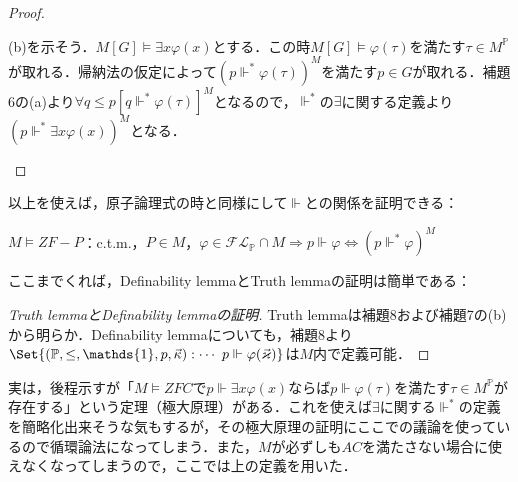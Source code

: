 \documentclass[a4j]{bxjsarticle}
\theoremstyle{definition}
\begin{document}
\begin{proof}
\begin{description}[style=nextline,font=\underline]
 (b)を示そう．$M[G] \models \exists x \varphi(x)$とする．この時$M[G] \models \varphi(\tau)$を満たす$\tau \in M^\mathbb{P}$が取れる．帰納法の仮定によって$(p \mathrel{\Vdash^*} \varphi(\tau))^M$を満たす$p \in G$が取れる．補題6の(a)より$\forall q \leq p [q \mathrel{\Vdash^*} \varphi(\tau)]^M$となるので，$\mathrel{\Vdash^*}$の$\exists$に関する定義より$(p \mathrel{\Vdash^*} \exists x \varphi(x))^M$となる．
\end{description}\mbox{}
\end{proof}

以上を使えば，原子論理式の時と同様にして$\Vdash$との関係を証明できる：

\begin{lemma}\label{forces:relativization}
 $M \models ZF-P$：c.t.m.，$P \in M$，$\varphi \in \mathcal{FL}_\mathbb{P} \cap M \Longrightarrow p \Vdash \varphi \Leftrightarrow (p \mathrel{\Vdash^*} \varphi)^M$
\end{lemma}

ここまでくれば，Definability lemmaとTruth lemmaの証明は簡単である：

\begin{proof}[Truth lemmaとDefinability lemmaの証明]
 Truth lemmaは補題8および補題7の(b)から明らか．Definability lemmaについても，補題8より$\Set{(\mathbb{P}, \leq, \mathds{1}, p, \vec{\kappa}) : \cdots \ p \Vdash \varphi(\vec{\varkappa})}$は$M$内で定義可能．\mbox{}
\end{proof}

実は，後程示すが「$M \models ZFC$で$p \Vdash \exists x \varphi(x)$ならば$p \Vdash \varphi(\tau)$を満たす$\tau \in M^\mathbb{P}$が存在する」という定理（極大原理）がある．これを使えば$\exists$に関する$\mathrel{\Vdash^*}$の定義を簡略化出来そうな気もするが，その極大原理の証明にここでの議論を使っているので循環論法になってしまう．また，$M$が必ずしも$AC$を満たさない場合に使えなくなってしまうので，ここでは上の定義を用いた．

\nocite{Kunen:2011,Arai:2011,Tanaka:2007}
\printbibliography[title=参考文献]
\end{document}

